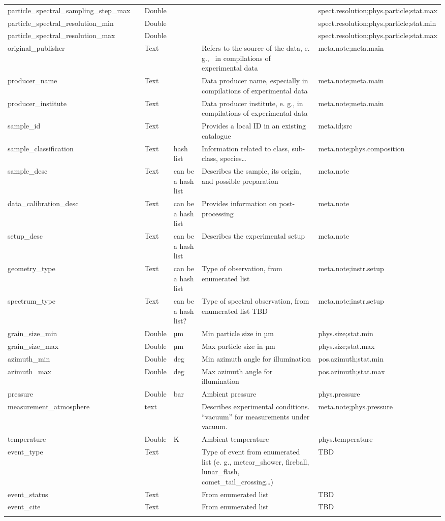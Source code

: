 \documentclass[11pt,a4paper]{ivoa}
\begin{document}
\begin{longtable}{p{3.5cm}p{0.5cm}p{1cm}p{1cm}p{7cm}p{3cm}}
particle\_spectral\_sampling\_step\_max&&Double&&&spect.resolution;phys.particle;stat.max \\
particle\_spectral\_resolution\_min&&Double&&&spect.resolution;phys.particle;stat.min \\
particle\_spectral\_resolution\_max&&Double&&&spect.resolution;phys.particle;stat.max \\
original\_publisher&&Text&&Refers to the source of the data, e. g.,  in compilations of experimental data&meta.note;meta.main\\
producer\_name&&Text&&Data producer name, especially in compilations of experimental data&meta.note;meta.main\\
producer\_institute&&Text&&Data producer institute, e. g., in compilations of experimental data&meta.note;meta.main\\
sample\_id&&Text&&Provides a local ID in an existing catalogue &meta.id;src\\
sample\_classification&&Text&hash list&Information related to class, sub-class, species… &meta.note;phys.composition\\
sample\_desc&&Text&can be a hash list&Describes the sample, its origin, and possible preparation&meta.note\\
data\_calibration\_desc&&Text&can be a hash list&Provides information on post-processing &meta.note\\
setup\_desc&&Text&can be a hash list&Describes the experimental setup &meta.note\\
geometry\_type&&Text&can be a hash list&Type of observation, from enumerated list&meta.note;instr.setup\\
spectrum\_type&&Text&can be a hash list?&Type of spectral observation, from enumerated list TBD&meta.note;instr.setup\\
grain\_size\_min&&Double&µm&Min particle size in µm&phys.size;stat.min\\
grain\_size\_max&&Double&µm&Max particle size in µm&phys.size;stat.max\\
azimuth\_min&&Double&deg&Min azimuth angle for illumination&pos.azimuth;stat.min\\
azimuth\_max&&Double&deg&Max azimuth angle for illumination&pos.azimuth;stat.max\\
pressure&&Double&bar&Ambient pressure&phys.pressure\\
measurement\_atmosphere&&text&&Describes experimental conditions. ``vacuum'' for measurements under vacuum.&meta.note;phys.pressure\\
temperature&&Double&K&Ambient temperature&phys.temperature\\
event\_type&&Text&&Type of event from enumerated list (e. g., meteor\_shower, fireball, lunar\_flash, comet\_tail\_crossing…)&TBD\\
event\_status&&Text&&From enumerated list&TBD\\
event\_cite&&Text&&From enumerated list&TBD\\
\sptablerule
\end{longtable}
\endgroup
\end{document}
